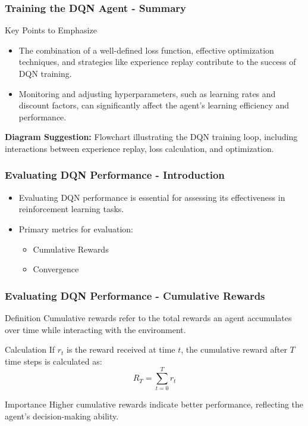 \documentclass{beamer}
\begin{document}
\begin{frame}
    \frametitle{Training the DQN Agent - Summary}
    \begin{block}{Key Points to Emphasize}
        \begin{itemize}
            \item The combination of a well-defined loss function, effective optimization techniques, and strategies like experience replay contribute to the success of DQN training.
            \item Monitoring and adjusting hyperparameters, such as learning rates and discount factors, can significantly affect the agent's learning efficiency and performance.
        \end{itemize}
    \end{block}
    
    \textbf{Diagram Suggestion:} Flowchart illustrating the DQN training loop, including interactions between experience replay, loss calculation, and optimization.
\end{frame}

\begin{frame}[fragile]
    \frametitle{Evaluating DQN Performance - Introduction}
    \begin{itemize}
        \item Evaluating DQN performance is essential for assessing its effectiveness in reinforcement learning tasks.
        \item Primary metrics for evaluation:
        \begin{itemize}
            \item Cumulative Rewards
            \item Convergence
        \end{itemize}
    \end{itemize}
\end{frame}

\begin{frame}[fragile]
    \frametitle{Evaluating DQN Performance - Cumulative Rewards}
    \begin{block}{Definition}
        Cumulative rewards refer to the total rewards an agent accumulates over time while interacting with the environment.
    \end{block}
    \begin{block}{Calculation}
        If \( r_t \) is the reward received at time \( t \), the cumulative reward after \( T \) time steps is calculated as:
        \begin{equation}
        R_T = \sum_{t=0}^{T} r_t
        \end{equation}
    \end{block}
    \begin{block}{Importance}
        Higher cumulative rewards indicate better performance, reflecting the agent's decision-making ability.
    \end{block}
\end{frame}
\end{document}
